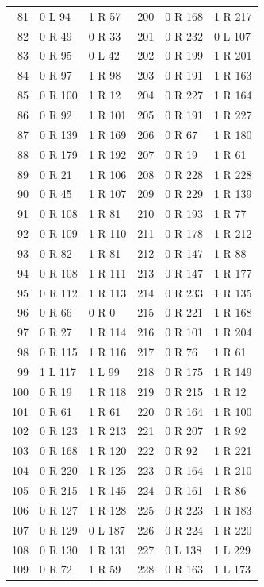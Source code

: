 \begin{center}
\begin{longtable}{rll@{\qquad}rll}
81 & 0 L 94 & 1 R 57 & 200 & 0 R 168 & 1 R 217\\
82 & 0 R 49 & 0 R 33 & 201 & 0 R 232 & 0 L 107\\
83 & 0 R 95 & 0 L 42 & 202 & 0 R 199 & 1 R 201\\
84 & 0 R 97 & 1 R 98 & 203 & 0 R 191 & 1 R 163\\
85 & 0 R 100 & 1 R 12 & 204 & 0 R 227 & 1 R 164\\
86 & 0 R 92 & 1 R 101 & 205 & 0 R 191 & 1 R 227\\
87 & 0 R 139 & 1 R 169 & 206 & 0 R 67 & 1 R 180\\
88 & 0 R 179 & 1 R 192 & 207 & 0 R 19 & 1 R 61\\
89 & 0 R 21 & 1 R 106 & 208 & 0 R 228 & 1 R 228\\
90 & 0 R 45 & 1 R 107 & 209 & 0 R 229 & 1 R 139\\
91 & 0 R 108 & 1 R 81 & 210 & 0 R 193 & 1 R 77\\
92 & 0 R 109 & 1 R 110 & 211 & 0 R 178 & 1 R 212\\
93 & 0 R 82 & 1 R 81 & 212 & 0 R 147 & 1 R 88\\
94 & 0 R 108 & 1 R 111 & 213 & 0 R 147 & 1 R 177\\
95 & 0 R 112 & 1 R 113 & 214 & 0 R 233 & 1 R 135\\
96 & 0 R 66 & 0 R 0 & 215 & 0 R 221 & 1 R 168\\
97 & 0 R 27 & 1 R 114 & 216 & 0 R 101 & 1 R 204\\
98 & 0 R 115 & 1 R 116 & 217 & 0 R 76 & 1 R 61\\
99 & 1 L 117 & 1 L 99 & 218 & 0 R 175 & 1 R 149\\
100 & 0 R 19 & 1 R 118 & 219 & 0 R 215 & 1 R 12\\
101 & 0 R 61 & 1 R 61 & 220 & 0 R 164 & 1 R 100\\
102 & 0 R 123 & 1 R 213 & 221 & 0 R 207 & 1 R 92\\
103 & 0 R 168 & 1 R 120 & 222 & 0 R 92 & 1 R 221\\
104 & 0 R 220 & 1 R 125 & 223 & 0 R 164 & 1 R 210\\
105 & 0 R 215 & 1 R 145 & 224 & 0 R 161 & 1 R 86\\
106 & 0 R 127 & 1 R 128 & 225 & 0 R 223 & 1 R 183\\
107 & 0 R 129 & 0 L 187 & 226 & 0 R 224 & 1 R 220\\
108 & 0 R 130 & 1 R 131 & 227 & 0 L 138 & 1 L 229\\
109 & 0 R 72 & 1 R 59 & 228 & 0 R 163 & 1 L 173\\

\end{longtable}
\end{center}
